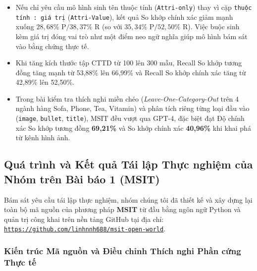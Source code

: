 \documentclass[conference,10pt]{IEEEtran}
\newcommand{\GitHubRepoURL}{https://github.com/linhnnh688/msit-open-world}
\begin{document}
\begin{enumerate}
    \begin{itemize}
        \item Nếu chỉ yêu cầu mô hình sinh tên thuộc tính (\texttt{Attri-only}) thay vì cặp \texttt{thuộc tính : giá trị} (\texttt{Attri-Value}), kết quả So khớp chính xác giảm mạnh xuống $28,68\% \text{ P} / 38,37\% \text{ R}$ (so với $35,34\% \text{ P} / 52,50\% \text{ R}$). Việc buộc sinh kèm giá trị đóng vai trò như một điểm neo ngữ nghĩa giúp mô hình bám sát vào bằng chứng thực tế.
        \item Khi tăng kích thước tập CTTD từ 100 lên 300 mẫu, Recall So khớp tương đồng tăng mạnh từ 53,88\% lên 66,99\% và Recall So khớp chính xác tăng từ 42,89\% lên 52,50\%.
        \item Trong bài kiểm tra thích nghi miền chéo (\textit{Leave-One-Category-Out} trên 4 ngành hàng Sofa, Phone, Tea, Vitamin) và phân tích riêng từng loại đầu vào (\texttt{image}, \texttt{bullet}, \texttt{title}), MSIT đều vượt qua GPT-4, đặc biệt đạt Độ chính xác So khớp tương đồng \textbf{69,21\%} và So khớp chính xác \textbf{40,96\%} khi khai phá từ kênh hình ảnh.
    \end{itemize}
\end{enumerate}

\subsection{Quá trình và Kết quả Tái lập Thực nghiệm của Nhóm trên Bài báo 1 (MSIT)}

Bám sát yêu cầu tái lập thực nghiệm, nhóm chúng tôi đã thiết kế và xây dựng lại toàn bộ mã nguồn của phương pháp \textbf{MSIT} từ đầu bằng ngôn ngữ Python và quản trị công khai trên nền tảng GitHub tại địa chỉ: \href{\GitHubRepoURL}{\texttt{\GitHubRepoURL}}.

\subsubsection{Kiến trúc Mã nguồn và Điều chỉnh Thích nghi Phần cứng Thực tế}
\end{document}
